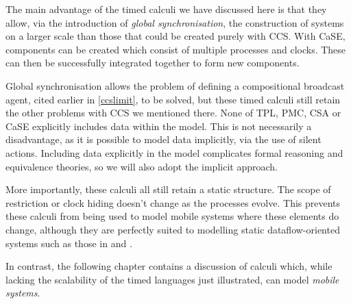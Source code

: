 The main advantage of the timed calculi we have discussed here is that
they allow, via the introduction of \emph{global synchronisation}, the
construction of systems on a larger scale than those that could be
created purely with CCS.  With CaSE, components can be created which
consist of multiple processes and clocks.  These can then be
successfully integrated together to form new components.

Global synchronisation allows the problem of defining a compositional
broadcast agent, cited earlier in \ref{ccslimit}, to be solved, but
these timed calculi still retain the other problems with CCS we
mentioned there.  None of TPL, PMC, CSA or CaSE explicitly includes
data within the model.  This is not necessarily a disadvantage, as it
is possible to model data implicitly, via the use of silent actions.
Including data explicitly in the model complicates formal reasoning
and equivalence theories, so we will also adopt the implicit approach.

More importantly, these calculi all still retain a static structure.
The scope of restriction or clock hiding doesn't change as the
processes evolve.  This prevents these calculi from being used to
model mobile systems where these elements do change, although they
are perfectly suited to modelling static dataflow-oriented systems
such as those in \cite{WICSA} and \cite{cashews-sem}.

In contrast, the following chapter contains a discussion of calculi
which, while lacking the scalability of the timed languages just
illustrated, can model \emph{mobile systems}.

